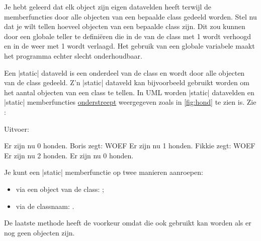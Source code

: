 \begin{cpplstShortInline}
\label{sec:staticclassmembers}
Je hebt geleerd dat elk object zijn eigen datavelden heeft terwijl de memberfuncties door alle objecten van een bepaalde class gedeeld worden.
Stel nu dat je wilt tellen hoeveel objecten van een bepaalde class  zijn.
Dit zou kunnen door een globale teller te definiëren die in de  van de class met 1 wordt verhoogd en in de  weer met 1 wordt verlaagd.
Het gebruik van een globale variabele maakt het programma echter slecht onderhoudbaar.

Een |static| dataveld is een onderdeel van de class en wordt door alle objecten van de class gedeeld.
Z'n |static| dataveld kan bijvoorbeeld gebruikt worden om het aantal  objecten van een class te tellen.
In UML worden |static| datavelden en |static| memberfuncties \underline{onderstreept} weergegeven zoals in \cref{fig:hond} te zien is. Zie :

\begin{minipage}{\textwidth}
\begin{minipage}[c]{.5\textwidth}
\end{minipage}
\hfill
\begin{minipage}[c]{.45\textwidth}
\end{minipage} 
\end{minipage} 

Uitvoer:
\begin{coutput}
Er zijn nu 0 honden.
Boris zegt: WOEF
Er zijn nu 1 honden.
Fikkie zegt: WOEF
Er zijn nu 2 honden.
Er zijn nu 0 honden.
\end{coutput}

Je kunt een |static| memberfunctie op twee manieren aanroepen:
\begin{itemize}
    \item via een object van de class: ;
    \item via de classnaam: .
\end{itemize}
De laatste methode heeft de voorkeur omdat die ook gebruikt kan worden als er nog geen objecten zijn.


\end{cpplstShortInline}
